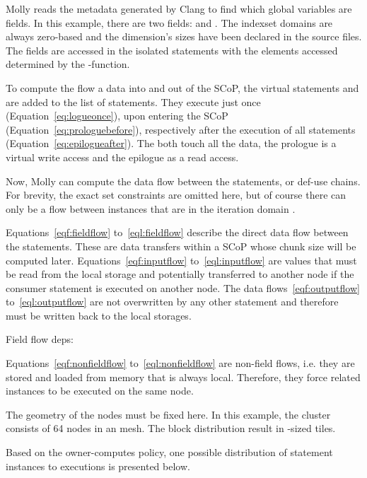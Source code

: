 \documentclass{sigplanconf}
\begin{document}
Molly reads the metadata generated by Clang to find which global variables are fields. In this example, there are two fields:  and . The indexset domains are always zero-based and the dimension's sizes have been declared in the source files. The fields are accessed in the isolated statements with the elements accessed determined by the -function.





To compute the flow a data into and out of the SCoP, the virtual statements  and  are added to the list of statements. They execute just once (Equation~\ref{eq:logueonce}), upon entering the SCoP (Equation~\ref{eq:prologuebefore}), respectively after the execution of all statements (Equation~\ref{eq:epilogueafter}). The both touch all the data, the prologue is a virtual write access and the epilogue as a read access.




Now, Molly can compute the data flow between the statements, or def-use chains. For brevity, the exact set constraints are omitted here, but of course there can only be a flow between instances that are in the iteration domain .

Equations~\ref{eqf:fieldflow} to~\ref{eql:fieldflow} describe the direct data flow between the statements. These are data transfers within a SCoP whose chunk size will be computed later. Equations~\ref{eqf:inputflow} to~\ref{eql:inputflow} are values that must be read from the local storage and potentially transferred to another node if the consumer statement is executed on another node. The data flows~\ref{eqf:outputflow} to~\ref{eql:outputflow} are not overwritten by any other statement and therefore must be written back to the local storages.
 
\newcommand*{\flow}{\;\delta\;}
Field flow deps:



Equations~\ref{eqf:nonfieldflow} to~\ref{eql:nonfieldflow} are non-field flows, i.e. they are stored and loaded from memory that is always local. Therefore, they force  related instances to be executed on the same node.


 

The geometry of the nodes must be fixed here. In this example, the cluster consists of 64 nodes in an  mesh. The block distribution result in -sized tiles.




Based on the owner-computes policy, one possible distribution of statement instances to executions is presented below.
\end{document}
